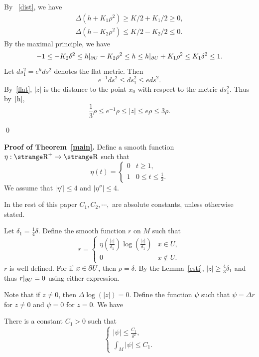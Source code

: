 By ~\eqref{dist}, we have
\[
\begin{array}{l}
\Delta(h+K_1\rho^2)\geq K/2+K_1/2\geq 0,\\
\Delta(h-K_2\rho^2)\leq K/2-K_2/2\leq 0.
\end{array}
\]
By the maximal principle, we have
\begin{equation}\label{h}
-1\leq -K_2\delta^2\leq h|_{\partial U}-K_2\rho^2\leq h\leq
h|_{\partial U}+K_1\rho^2\leq K_1\delta^2
\leq 1.
\end{equation}
Let $ds_1^2=e^h ds^2$ denotes the flat metric. Then
\[
e^{-1} ds^2\leq ds_1^2\leq e ds^2.
\]
By~\eqref{flat}, $|z|$ is the distance to the point $x_0$
with respect to the metric $ds_1^2$.
Thus by~\eqref{h},
\[
\frac 13\rho\leq e^{-1}\rho\leq |z|\leq e\rho
\leq 3\rho.
\]

\qed

{\bf Proof of Theorem~\ref{main}.}
Define a smooth function $\eta: \R^+\rightarrow\R$ such that
\begin{equation}\label{eta}
\eta(t)=\left\{
\begin{array}{ll}
0 & t\geq 1,\\
1 & 0\leq t\leq \frac 12.
\end{array}
\right.
\end{equation}
We assume that 
$|\eta'|\leq 4$ and $|\eta''|\leq 4$.

In the rest of this paper $C_1, C_2,\cdots,$ are absolute constants, 
unless otherwise stated.


Let
$\delta_1=\frac 14\delta$.
Define the smooth  function $r$ on $M$ such that 
\begin{equation}\label{deff}
r=\left\{
\begin{array}{ll}
\eta(\frac{|z|}{\delta_1})\log (\frac{|z|}{\delta_1}) &
x\in U,\\
0 & x\notin U.
\end{array}
\right.
\end{equation}
$r$ is well defined.  
For if $x\in\partial U$, then $\rho=\delta$. By the Lemma~\ref{esti},
$|z|\geq\frac 43 \delta_1$ and thus $r|_{\partial U}=0$ using either
expression.


Note that if $z\neq 0$, then $\Delta\log (|z|)=0$. Define the
function
$\psi$ such that $\psi=\Delta r$ for $z\neq 0$ and $\psi=0$ for 
$z=0$. We have

\begin{lemma}\label{lem23}
There is a constant $C_1>0$ such that
\begin{equation}\label{esti2}
\left\{
\begin{array}{l}
|\psi|\leq \frac{C_1}{\delta^2},\\
\int_M|\psi|\leq C_1.
\end{array}
\right.
\end{equation}
\end{lemma}

